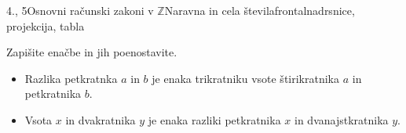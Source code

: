 \begin{priprava}{4., 5}{}{Osnovni računski zakoni v $\mathbb{Z}$}{Naravna in cela števila}{frontalna}{drsnice, projekcija, tabla}
    \begin{naloga}
        Zapišite enačbe in jih poenostavite.
        \begin{itemize}
            \item Razlika petkratnka $a$ in $b$ je enaka trikratniku vsote štirikratnika $a$ in petkratnika $b$.   
            \item Vsota $x$ in dvakratnika $y$ je enaka razliki petkratnika $x$ in dvanajstkratnika $y$.    
        \end{itemize}
    \end{naloga}


\end{priprava}